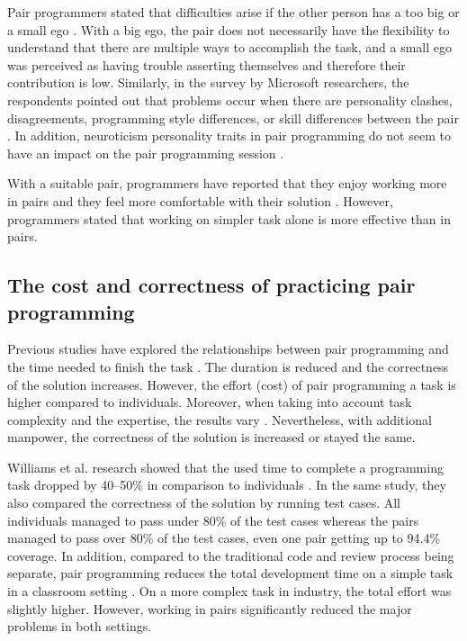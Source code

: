 \documentclass[conference]{IEEEtran}
\begin{document}
Pair programmers stated that difficulties arise if the other person has a too big or a small ego \cite{Williams2000Strengthening}. With a big ego, the pair does not necessarily have the flexibility to understand that there are multiple ways to accomplish the task, and a small ego was perceived as having trouble asserting themselves and therefore their contribution is low. Similarly, in the survey by Microsoft researchers, the respondents pointed out that problems occur when there are personality clashes, disagreements, programming style differences, or skill differences between the pair \cite{10.1145/1414004.1414026}. In addition, neuroticism personality traits in pair programming do not seem to have an impact on the pair programming session \cite{10.1145/1852786.1852816}.

With a suitable pair, programmers have reported that they enjoy working more in pairs and they feel more comfortable with their solution \cite{Williams2000Strengthening}. However, programmers stated that working on simpler task alone is more effective than in pairs. 


\subsection{The cost and correctness of practicing pair programming}

Previous studies have explored the relationships between pair programming and the time needed to finish the task \cite{10.1145/1414004.1414026, 10.5555/377517.377531, Arisholm2007Evaluating}. The duration is reduced and the correctness of the solution increases. However, the effort (cost) of pair programming a task is higher compared to individuals. Moreover, when taking into account task complexity and the expertise, the results vary \cite{Arisholm2007Evaluating}. Nevertheless, with additional manpower, the correctness of the solution is increased or stayed the same.

Williams et al. research showed that the used time to complete a programming task dropped by 40--50\% in comparison to individuals \cite{Williams2000Strengthening}. In the same study, they also compared the correctness of the solution by running test cases. All individuals managed to pass under 80\% of the test cases whereas the pairs managed to pass over 80\% of the test cases, even one pair getting up to 94.4\% coverage. In addition, compared to the traditional code and review process being separate, pair programming reduces the total development time on a simple task in a classroom setting \cite{10.1145/1159733.1159749}. On a more complex task in industry, the total effort was slightly higher. However, working in pairs significantly reduced the major problems in both settings. 
\end{document}
